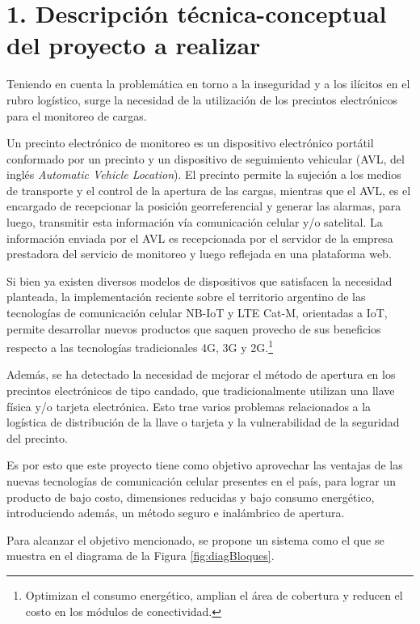 \documentclass[
11pt, %
]{charter}
\begin{document}
\section{1. Descripción técnica-conceptual del proyecto a realizar}
\label{sec:descripcion}

Teniendo en cuenta la problemática en torno a la inseguridad y a los ilícitos en el rubro logístico, surge la necesidad de la utilización de los precintos electrónicos para el monitoreo de cargas.

Un precinto electrónico de monitoreo es un dispositivo electrónico portátil conformado por un precinto y un dispositivo de seguimiento vehicular (AVL, del inglés \textit{Automatic Vehicle Location}). El precinto permite la sujeción a los medios de transporte y el control de la apertura de las cargas, mientras que el AVL, es el encargado de recepcionar la posición georreferencial y generar las alarmas, para luego, transmitir esta información vía comunicación celular y/o satelital. La información enviada por el AVL es recepcionada por el servidor de la empresa prestadora del servicio de monitoreo y luego reflejada en una plataforma web.

Si bien ya existen diversos modelos de dispositivos que satisfacen la necesidad planteada, la implementación reciente sobre el territorio argentino de las tecnologías de comunicación celular NB-IoT y LTE Cat-M, orientadas a IoT, permite desarrollar nuevos productos que saquen provecho de sus beneficios respecto a las tecnologías tradicionales 4G, 3G y 2G.\footnote{Optimizan el consumo energético, amplian el área de cobertura y reducen el costo en los módulos de conectividad.}

Además, se ha detectado la necesidad de mejorar el método de apertura en los precintos electrónicos de tipo candado, que tradicionalmente utilizan una llave física y/o tarjeta electrónica. Esto trae varios problemas relacionados a la logística de distribución de la llave o tarjeta y la vulnerabilidad de la seguridad del precinto.

Es por esto que este proyecto tiene como objetivo aprovechar las ventajas de las nuevas tecnologías de comunicación celular presentes en el país, para lograr un producto de bajo costo, dimensiones reducidas y bajo consumo energético, introduciendo además, un método seguro e inalámbrico de apertura. 

Para alcanzar el objetivo mencionado, se propone un sistema como el que se muestra en el diagrama de la Figura \ref{fig:diagBloques}.
\end{document}
